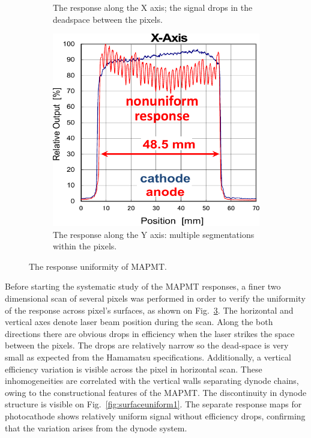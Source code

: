 \begin{figure}[b]
\begin{subfigure}{0.3\linewidth}
		\caption{The response along the X axis; the signal drops in the deadspace between the pixels.}
		\label{fig:surfaceuniform2}
	\end{subfigure}
	\quad
	\begin{subfigure}{0.3\linewidth}
		\includegraphics[width=\linewidth]{figures/surfaceuniform2.pdf}
		\caption{The response along the Y axis: multiple segmentations within the pixels.}
		\label{fig:surfaceuniform3}
	\end{subfigure}
	\caption{The response uniformity of MAPMT.}
	\label{fig:surfaceuniform}
\end{figure}


Before starting the systematic study of the MAPMT responses, a finer two dimensional scan of several pixels was performed in order to verify the uniformity of the response across pixel's surfaces, as shown on Fig.~\ref{fig:surfaceuniform}.
The horizontal and vertical axes denote laser beam position during the scan.
Along the both directions there are obvious drops in efficiency when the laser strikes the space between the pixels.
The drops are relatively narrow so the dead-space is very small as expected from the Hamamatsu specifications.
Additionally, a vertical efficiency variation is visible across the pixel in horizontal scan.
These inhomogeneities are correlated with the vertical walls separating dynode chains, owing to the constructional features of the MAPMT. The discontinuity in dynode structure is visible  on Fig.~\ref{fig:surfaceuniform1}.
The separate response maps for photocathode shows relatively uniform signal without efficiency drops, confirming that the variation arises from the dynode system.

